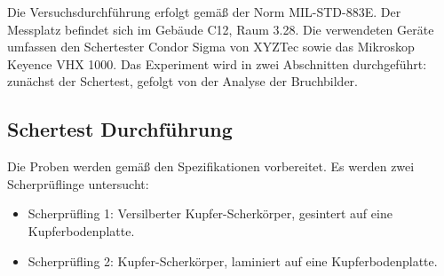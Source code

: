 Die Versuchsdurchführung erfolgt gemäß der Norm MIL-STD-883E. Der Messplatz befindet sich im Gebäude C12, Raum 3.28. Die verwendeten Geräte umfassen den Schertester Condor Sigma von XYZTec sowie das Mikroskop Keyence VHX 1000. Das Experiment wird in zwei Abschnitten durchgeführt: zunächst der Schertest, gefolgt von der Analyse der Bruchbilder.

\subsection{Schertest Durchführung}
Die Proben werden gemäß den Spezifikationen vorbereitet. Es werden zwei Scherprüflinge untersucht:
\begin{itemize}
    \item Scherprüfling 1: Versilberter Kupfer-Scherkörper, gesintert auf eine Kupferbodenplatte.
    \item     Scherprüfling 2: Kupfer-Scherkörper, laminiert auf eine Kupferbodenplatte.
\end{itemize}